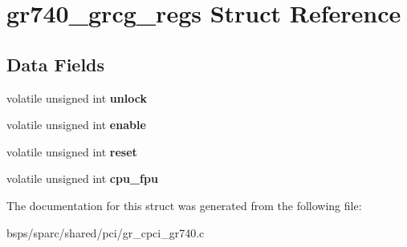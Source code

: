 \hypertarget{structgr740__grcg__regs}{}\section{gr740\+\_\+grcg\+\_\+regs Struct Reference}
\label{structgr740__grcg__regs}
\subsection*{Data Fields}
\begin{DoxyCompactItemize}
\item 
\mbox{\label{structgr740__grcg__regs_a16c195a5a90403b74e653df6113ca246}} 
volatile unsigned int {\bfseries unlock}
\item 
\mbox{\label{structgr740__grcg__regs_a89da93915e01272d1deac97ba2550264}} 
volatile unsigned int {\bfseries enable}
\item 
\mbox{\label{structgr740__grcg__regs_afffa03d27c02068b7bfc7fad3e78eb5b}} 
volatile unsigned int {\bfseries reset}
\item 
\mbox{\label{structgr740__grcg__regs_abfdc9f98c464fcc9eed45d6a746d7d19}} 
volatile unsigned int {\bfseries cpu\+\_\+fpu}
\end{DoxyCompactItemize}


The documentation for this struct was generated from the following file\+:\begin{DoxyCompactItemize}
\item 
bsps/sparc/shared/pci/gr\+\_\+cpci\+\_\+gr740.\+c\end{DoxyCompactItemize}
